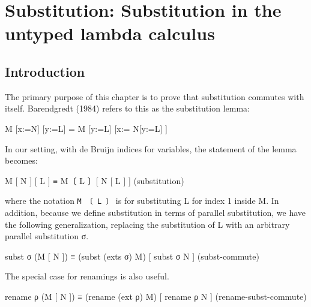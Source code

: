 \hypertarget{Substitution}{%
\chapter{Substitution: Substitution in the untyped lambda
calculus}\label{Substitution}}

\begin{fence}
\begin{code}%
\>[0]\AgdaSpace{}%
\AgdaSpace{}%
\<%
\end{code}
\end{fence}

\hypertarget{introduction}{%
\section{Introduction}\label{introduction}}

The primary purpose of this chapter is to prove that substitution
commutes with itself. Barendgredt (1984) refers to this as the
substitution lemma:

\begin{myDisplay}
M [x:=N] [y:=L] = M [y:=L] [x:= N[y:=L] ]
\end{myDisplay}

In our setting, with de Bruijn indices for variables, the statement of
the lemma becomes:

\begin{myDisplay}
M [ N ] [ L ] ≡  M〔 L 〕[ N [ L ] ]                     (substitution)
\end{myDisplay}

where the notation \texttt{M\ 〔\ L\ 〕} is for substituting L for index
1 inside M. In addition, because we define substitution in terms of
parallel substitution, we have the following generalization, replacing
the substitution of L with an arbitrary parallel substitution σ.

\begin{myDisplay}
subst σ (M [ N ]) ≡ (subst (exts σ) M) [ subst σ N ]    (subst-commute)
\end{myDisplay}

The special case for renamings is also useful.

\begin{myDisplay}
rename ρ (M [ N ]) ≡ (rename (ext ρ) M) [ rename ρ N ]
                                                 (rename-subst-commute)
\end{myDisplay}

